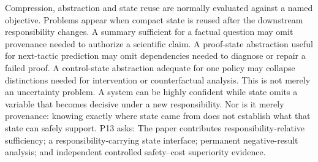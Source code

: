 \markdownRendererDocumentBegin
\markdownRendererSectionBegin
{}\markdownRendererInterblockSeparator
{}Compression, abstraction and state reuse are normally evaluated against a named objective. Problems appear when compact state is reused after the downstream responsibility changes. A summary sufficient for a factual question may omit provenance needed to authorize a scientific claim. A proof-state abstraction useful for next-tactic prediction may omit dependencies needed to diagnose or repair a failed proof. A control-state abstraction adequate for one policy may collapse distinctions needed for intervention or counterfactual analysis.\markdownRendererInterblockSeparator
{}This is not merely an uncertainty problem. A system can be highly confident while state omits a variable that becomes decisive under a new responsibility. Nor is it merely provenance: knowing exactly where state came from does not establish what that state can safely support.\markdownRendererInterblockSeparator
{}P13 asks:\markdownRendererInterblockSeparator
{}\markdownRendererBlockQuoteBegin
{}
\markdownRendererBlockQuoteEnd \markdownRendererInterblockSeparator
{}The paper contributes responsibility-relative sufficiency; a responsibility-carrying state interface; permanent negative-result analysis; and independent controlled safety–cost superiority evidence.
\markdownRendererSectionEnd \markdownRendererDocumentEnd